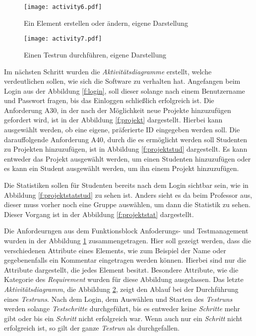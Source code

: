 \documentclass[11pt,a4paper]{report}
\begin{document}
\begin{figure}[htpb]
  \centering
  \texttt{[image: activity6.pdf]}
  \caption{Ein Element erstellen oder ändern, eigene Darstellung}
  \label{f:element}
\end{figure}

\begin{figure}[htpb]
  \centering
  \texttt{[image: activity7.pdf]}
  \caption{Einen Testrun durchführen, eigene Darstellung}
  \label{f:testrun}
\end{figure}

Im nächsten Schritt wurden die \textit{Aktivitätsdiagramme} erstellt, welche verdeutlichen sollen, wie sich die Software zu verhalten hat. Angefangen beim Login aus der Abbildung \ref{f:login}, soll dieser solange nach einem Benutzername und Passwort fragen, bis das Einloggen schließlich erfolgreich ist. Die Anforderung A30, in der nach der Möglichkeit neue Projekte hinzuzufügen gefordert wird, ist in der Abbildung \ref{f:projekt} dargestellt. Hierbei kann ausgewählt werden, ob eine eigene, präferierte ID eingegeben werden soll. Die darauffolgende Anforderung A40, durch die es ermöglicht werden soll Studenten zu Projekten hinzuzufügen, ist in Abbildung \ref{f:projektstud} dargestellt. Es kann entweder das Projekt ausgewählt werden, um einen Studenten hinzuzufügen oder es kann ein Student ausgewählt werden, um ihn einem Projekt hinzuzufügen.

Die Statistiken sollen für Studenten bereits nach dem Login sichtbar sein, wie in Abbildung \ref{f:projektstatstud} zu sehen ist. Anders sieht es da beim Professor aus, dieser muss vorher noch eine Gruppe auswählen, um dann die Statistik zu sehen. Dieser Vorgang ist in der Abbildung \ref{f:projektstat} dargestellt.


Die Anfordeurngen aus dem Funktionsblock Anfoderungs- und Testmanagement wurden in der Abbildung \ref{f:element} zusammengetragen. Hier soll gezeigt werden, dass die verschiedenen Attribute eines Elements, wie zum Beispiel der Name oder gegebenenfalls ein Kommentar eingetragen werden können. Hierbei sind nur die Attribute dargestellt, die jedes Element besitzt. Besondere Attribute, wie die Kategorie des \textit{Requirement} wurden für diese Abbildung ausgelassen. Das letzte \textit{Aktivitätsdiagramm}, die Abbildung \ref{f:testrun}, zeigt den Ablauf bei der Durchführung eines \textit{Testruns}. Nach dem Login, dem Auswählen und Starten des \textit{Testruns} werden solange \textit{Testschritte} durchgeführt, bis es entweder keine \textit{Schritte} mehr gibt oder bis ein \textit{Schritt} nicht erfolgreich war. Wenn auch nur ein \textit{Schritt} nicht erfolgreich ist, so gilt der ganze \textit{Testrun} als durchgefallen.
\end{document}
